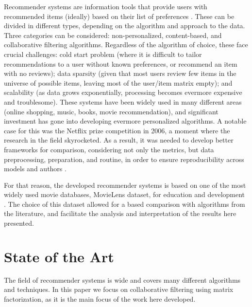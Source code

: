 \documentclass[conference]{IEEEtran}
\begin{document}
Recommender systems are information tools that provide users with recommended items (ideally) based on their list of preferences \cite{Konstan2012,KATARYA2017105}. These can be divided in different types, depending on the algorithm and approach to the data. Three categories can be considered: non-personalized, content-based, and collaborative filtering algorithms. Regardless of the algorithm of choice, these face crucial challenges: cold start problem (where it is difficult to tailor recommendations to a user without known preferences, or recommend an item with no reviews); data sparsity (given that most users review few items in the universe of possible items, leaving most of the user/item matrix empty); and scalability (as data grows exponentially, processing becomes evermore expensive and troublesome). These systems have been widely used in many different areas (online shopping, music, books, movie recommendation), and significant investment has gone into developing evermore personalized algorithms. A notable case for this was the Netflix prize competition in 2006, a moment where the research in the field skyrocketed. As a result, it was needed to develop better frameworks for comparison, considering not only the metrics, but data preprocessing, preparation, and routine, in order to ensure reproducibility across models and authors \cite{10.1145/2645710.2645746}.

For that reason, the developed recommender systems is based on one of the most widely used movie databases, MovieLens dataset, for education and development \cite{Harper2015}. The choice of this dataset allowed for a based comparison with algorithms from the literature, and facilitate the analysis and interpretation of the results here presented. 


\section{State of the Art}

The field of recommender systems is wide and covers many different algorithms and techniques. In this paper we focus on collaborative filtering using matrix factorization, as it is the main focus of the work here developed.
\end{document}
